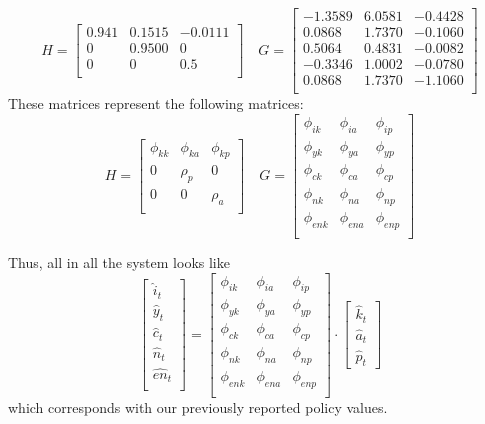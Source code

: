 \documentclass[a4paper,11pt]{article}
\begin{document}
$$H = \begin{bmatrix}
    0.941  &  0.1515 &  -0.0111 \\
    0  &  0.9500  &  0 \\
   0  &  0   & 0.5 \\
\end{bmatrix} \quad G = \begin{bmatrix}
   -1.3589  &  6.0581 &  -0.4428 \\
    0.0868  &  1.7370 &  -0.1060 \\
    0.5064  &  0.4831 &  -0.0082 \\
   -0.3346  &  1.0002 &  -0.0780 \\
    0.0868  &  1.7370 &  -1.1060 \\
\end{bmatrix}$$
These matrices represent the following matrices:
$$H = \begin{bmatrix}
    \phi_{kk}  &  \phi_{ka} &  \phi_{kp} \\
    0  &  \rho_p  &  0 \\
   0  &  0   & \rho_a \\
\end{bmatrix} \quad G = \begin{bmatrix}
    \phi_{ik} &  \phi_{ia} &  \phi_{ip} \\
    \phi_{yk} &  \phi_{ya} &  \phi_{yp} \\
    \phi_{ck} &  \phi_{ca} &  \phi_{cp} \\
    \phi_{nk} &  \phi_{na} &  \phi_{np} \\
    \phi_{enk} &  \phi_{ena} &  \phi_{enp} \\
\end{bmatrix}$$

Thus, all in all the system looks like
$$\begin{bmatrix}
    \hat{i}_t \\
    \hat{y}_t \\
    \hat{c}_t \\
    \hat{n}_t \\
    \hat{en}_t \\
\end{bmatrix} = \begin{bmatrix}
    \phi_{ik} &  \phi_{ia} &  \phi_{ip} \\
    \phi_{yk} &  \phi_{ya} &  \phi_{yp} \\
    \phi_{ck} &  \phi_{ca} &  \phi_{cp} \\
    \phi_{nk} &  \phi_{na} &  \phi_{np} \\
    \phi_{enk} &  \phi_{ena} &  \phi_{enp} \\
\end{bmatrix} \cdot \begin{bmatrix}
    \hat{k}_t \\
    \hat{a}_t \\
    \hat{p}_t 
\end{bmatrix}$$
which corresponds with our previously reported policy values.
\pagebreak
\end{document}
